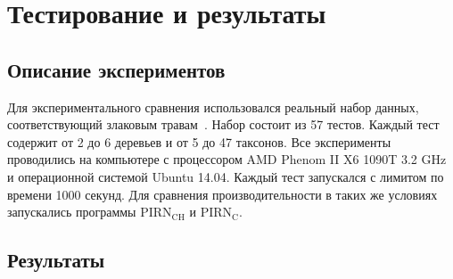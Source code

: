 \FloatBarrier
\chapter{Тестирование и результаты}

\FloatBarrier
\section{Описание экспериментов}

Для экспериментального сравнения использовался реальный набор данных, соответствующий злаковым травам~\cite{grass2001phylogeny}.
Набор состоит из 57 тестов.
Каждый тест содержит от 2 до 6 деревьев и от 5 до 47 таксонов.
Все эксперименты проводились на компьютере с процессором AMD Phenom II X6 1090T 3.2 GHz и операционной системой Ubuntu 14.04.
Каждый тест запускался с лимитом по времени 1000 секунд.
Для сравнения производительности в таких же условиях запускались программы $\mathrm{PIRN_{CH}}$ и $\mathrm{PIRN_C}$.

\FloatBarrier
\section{Результаты}

